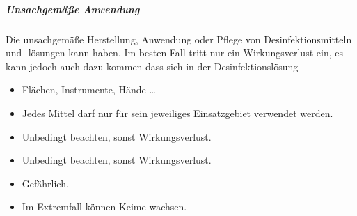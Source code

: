 { 

\subparagraph{Unsachgemäße Anwendung} Die unsachgemäße Herstellung, Anwendung
oder Pflege von Desinfektionsmitteln und -lösungen kann 
haben. Im besten Fall tritt nur ein Wirkungsverlust ein, es kann jedoch auch
dazu kommen dass sich in der Desinfektionslösung 

}{

\begin{itemize}
  \item Flächen, Instrumente, Hände \ldots{}
  \item Jedes Mittel darf nur für sein jeweiliges Einsatzgebiet verwendet  werden.
\end{itemize}


\begin{itemize}
  \item Unbedingt beachten, sonst Wirkungsverlust. 
\end{itemize}


\begin{itemize}
  \item Unbedingt beachten, sonst Wirkungsverlust. 
\end{itemize}


\begin{itemize}
  \item Gefährlich.
  \item Im Extremfall können Keime  wachsen.
\end{itemize}
}{}{}{}


